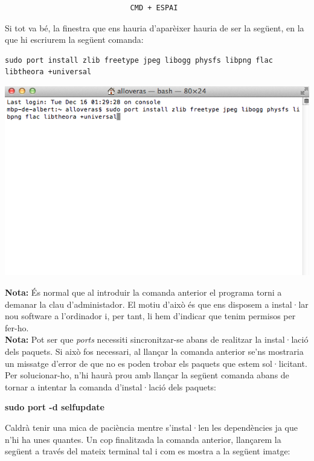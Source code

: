 \documentclass[11pt]{article}
\begin{document}
\begin{verbatim}
	                         CMD + ESPAI
\end{verbatim}

\noindent Si tot va bé, la finestra que ens hauria d'aparèixer hauria de ser la següent, en la que hi escriurem la següent comanda:

\begin{verbatim}
sudo port install zlib freetype jpeg libogg physfs libpng flac
libtheora +universal
\end{verbatim}

\begin{center}
	\includegraphics[scale=0.5]{img/Ports_Install_Libs.png}
\end{center}

\noindent \textbf{Nota:} És normal que al introduir la comanda anterior el programa torni a demanar la clau d'administador. El motiu d'això és que ens disposem a instal·lar nou software a l'ordinador i, per tant, li hem d'indicar que tenim permisos per fer-ho.\\

\noindent \textbf{Nota:} Pot ser que \textit{ports} necessiti sincronitzar-se abans de realitzar la instal·lació dels paquets. Si això fos necessari, al llançar la comanda anterior se'ns mostraria un missatge d'error de que no es poden trobar els paquets que estem sol·licitant. Per solucionar-ho, n'hi haurà prou amb llançar la següent comanda abans de tornar a intentar la comanda d'instal·lació dels paquets:
\begin{center}
	\textbf{sudo port -d selfupdate}
\end{center}


\newpage
\noindent Caldrà tenir una mica de paciència mentre s'instal·len les dependències ja que n'hi ha unes quantes. Un cop finalitzada la comanda anterior, llançarem la següent a través del mateix terminal tal i com es mostra a la següent imatge:
\end{document}
